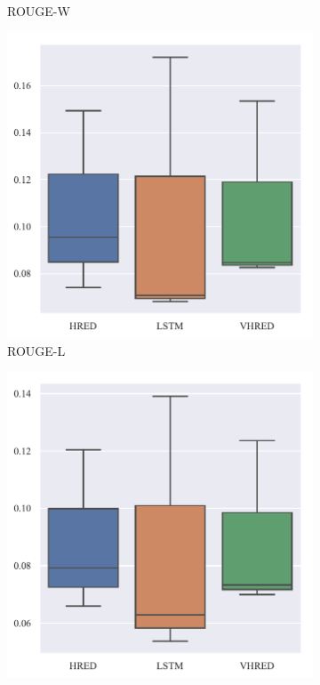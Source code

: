 \begin{figure}[H]
\begin{subfigure}{0.23\linewidth}
        \caption{ROUGE-W}
    \end{subfigure}%
    \begin{subfigure}{0.23\linewidth}
        \centering
        \includegraphics[width=\linewidth]{figure/boxplot/model/rouge_l/plot.pdf}
        \caption{ROUGE-L}
    \end{subfigure}%
    \begin{subfigure}{0.23\linewidth}
        \centering
        \includegraphics[width=\linewidth]{figure/boxplot/model/rouge_w/plot.pdf}

\end{subfigure}
\end{figure}
